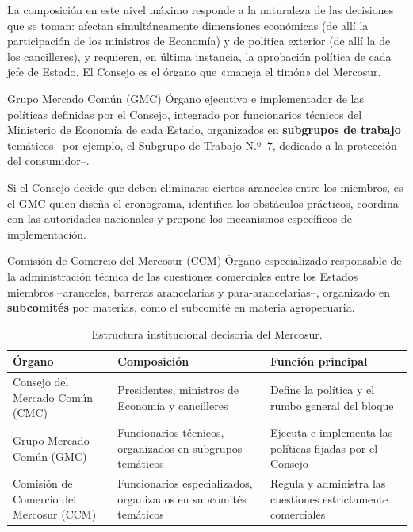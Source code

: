 \documentclass[12pt,oneside]{book}
\begin{document}
La composición en este nivel máximo responde a la naturaleza de las decisiones que se toman: afectan simultáneamente dimensiones económicas (de allí la participación de los ministros de Economía) y de política exterior (de allí la de los cancilleres), y requieren, en última instancia, la aprobación política de cada jefe de Estado. El Consejo es el órgano que «maneja el timón» del Mercosur.

\begin{definicion}{Grupo Mercado Común (GMC)}
Órgano ejecutivo e implementador de las políticas definidas por el Consejo, integrado por funcionarios técnicos del Ministerio de Economía de cada Estado, organizados en \textbf{subgrupos de trabajo} temáticos --por ejemplo, el Subgrupo de Trabajo N.º~7, dedicado a la protección del consumidor--.
\end{definicion}

Si el Consejo decide que deben eliminarse ciertos aranceles entre los miembros, es el GMC quien diseña el cronograma, identifica los obstáculos prácticos, coordina con las autoridades nacionales y propone los mecanismos específicos de implementación.

\begin{definicion}{Comisión de Comercio del Mercosur (CCM)}
Órgano especializado responsable de la administración técnica de las cuestiones comerciales entre los Estados miembros --aranceles, barreras arancelarias y para-arancelarias--, organizado en \textbf{subcomités} por materias, como el subcomité en materia agropecuaria.
\end{definicion}

\begin{table}[H]
\centering
\renewcommand{\arraystretch}{1.3}
\begin{tabularx}{\textwidth}{>{\raggedright\arraybackslash}p{}>{\raggedright\arraybackslash}X>{\raggedright\arraybackslash}X}
\toprule
\textbf{Órgano} & \textbf{Composición} & \textbf{Función principal} \\
\midrule
Consejo del Mercado Común (CMC) & Presidentes, ministros de Economía y cancilleres & Define la política y el rumbo general del bloque \\
Grupo Mercado Común (GMC) & Funcionarios técnicos, organizados en subgrupos temáticos & Ejecuta e implementa las políticas fijadas por el Consejo \\
Comisión de Comercio del Mercosur (CCM) & Funcionarios especializados, organizados en subcomités temáticos & Regula y administra las cuestiones estrictamente comerciales \\
\bottomrule
\end{tabularx}
\caption{Estructura institucional decisoria del Mercosur.}
\end{table}
\end{document}
